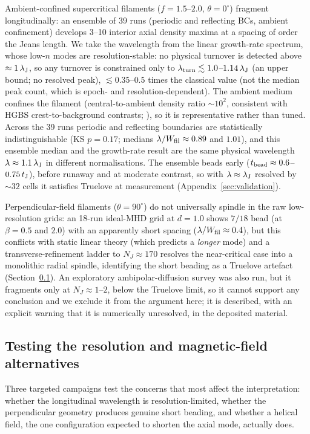 \documentclass[usenatbib,twoside,twocolumn]{mnras}
\begin{document}
Ambient-confined supercritical filaments ($f=1.5$--$2.0$, $\theta=0^\circ$) fragment longitudinally: an ensemble of 39 runs (periodic and reflecting BCs, ambient confinement) develops 3--10 interior axial density maxima at a spacing of order the Jeans length. We take the wavelength from the linear growth-rate spectrum, whose low-$n$ modes are resolution-stable: no physical turnover is detected above $\approx1\,\lambda_{\rm J}$, so any turnover is constrained only to $\lambda_{\rm turn}\lesssim1.0$--$1.14\,\lambda_{\rm J}$ (an upper bound; no resolved peak), $\lesssim0.35$--$0.5$ times the classical value (not the median peak count, which is epoch- and resolution-dependent). The ambient medium confines the filament (central-to-ambient density ratio $\sim10^2$, consistent with HGBS crest-to-background contrasts; \citealt{Arzoumanian2019}), so it is representative rather than tuned. Across the 39 runs periodic and reflecting boundaries are statistically indistinguishable (KS $p=0.17$; medians $\lambda/W_{\rm fil}\approx0.89$ and $1.01$), and this ensemble median and the growth-rate result are the same physical wavelength $\lambda\approx1.1\,\lambda_{\rm J}$ in different normalisations. The ensemble beads early ($t_{\rm bead}\approx0.6$--$0.75\,t_{\rm J}$), before runaway and at moderate contrast, so with $\lambda\approx\lambda_{\rm J}$ resolved by ${\sim}32$ cells it satisfies Truelove at measurement (Appendix~\ref{sec:validation}).

Perpendicular-field filaments ($\theta=90^\circ$) do not universally spindle in the raw low-resolution grids: an 18-run ideal-MHD grid at $d=1.0$ shows $7/18$ bead (at $\beta=0.5$ and $2.0$) with an apparently short spacing ($\lambda/W_{\rm fil}\approx0.4$), but this conflicts with static linear theory (which predicts a \emph{longer} mode) and a transverse-refinement ladder to $N_J\approx170$ resolves the near-critical case into a monolithic radial spindle, identifying the short beading as a Truelove artefact (Section~\ref{sec:optional_tests}). An exploratory ambipolar-diffusion survey was also run, but it fragments only at $N_J\approx1$--$2$, below the Truelove limit, so it cannot support any conclusion and we exclude it from the argument here; it is described, with an explicit warning that it is numerically unresolved, in the deposited material.

\subsection{Testing the resolution and magnetic-field alternatives}
\label{sec:optional_tests}
Three targeted campaigns test the concerns that most affect the interpretation: whether the longitudinal wavelength is resolution-limited, whether the perpendicular geometry produces genuine short beading, and whether a helical field, the one configuration expected to shorten the axial mode, actually does.
\end{document}
